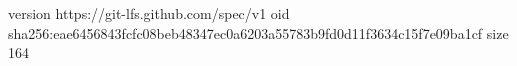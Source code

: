 version https://git-lfs.github.com/spec/v1
oid sha256:eae6456843fcfc08beb48347ec0a6203a55783b9fd0d11f3634c15f7e09ba1cf
size 164

